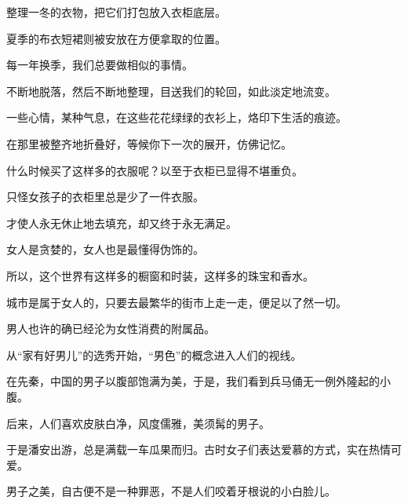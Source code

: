	\endwriting



		整理一冬的衣物，把它们打包放入衣柜底层。\par
		夏季的布衣短裙则被安放在方便拿取的位置。\par
		每一年换季，我们总要做相似的事情。\par
		不断地脱落，然后不断地整理，目送我们的轮回，如此淡定地流变。\par
		一些心情，某种气息，在这些花花绿绿的衣衫上，烙印下生活的痕迹。\par
		在那里被整齐地折叠好，等候你下一次的展开，仿佛记忆。


		什么时候买了这样多的衣服呢？以至于衣柜已显得不堪重负。\par
		只怪女孩子的衣柜里总是少了一件衣服。\par
		才使人永无休止地去填充，却又终于永无满足。\par
		女人是贪婪的，女人也是最懂得伪饰的。\par
		所以，这个世界有这样多的橱窗和时装，这样多的珠宝和香水。\par
		城市是属于女人的，只要去最繁华的街市上走一走，便足以了然一切。

		男人也许的确已经沦为女性消费的附属品。\par
		从“家有好男儿”的选秀开始，“男色”的概念进入人们的视线。\par
		在先秦，中国的男子以腹部饱满为美，于是，我们看到兵马俑无一例外隆起的小腹。\par
		后来，人们喜欢皮肤白净，风度儒雅，美须髯的男子。\par
		于是潘安出游，总是满载一车瓜果而归。古时女子们表达爱慕的方式，实在热情可爱。\par
		男子之美，自古便不是一种罪恶，不是人们咬着牙根说的小白脸儿。

